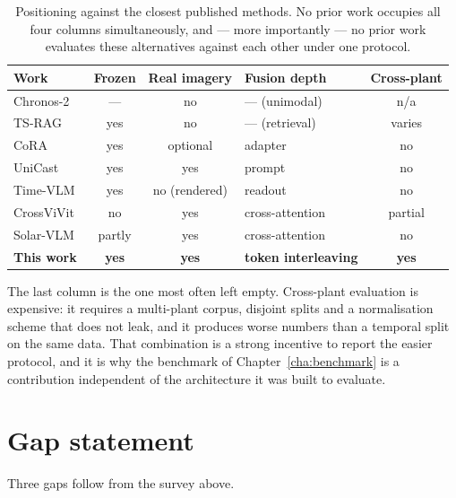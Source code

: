 \begin{table}[h!]
\centering
\small
\begin{tabular}{l c c l c}
\hline
\textbf{Work} & \textbf{Frozen} & \textbf{Real imagery} & \textbf{Fusion depth} &
\textbf{Cross-plant} \\
\hline
Chronos-2~\cite{chronos2} & --- & no & --- (unimodal) & n/a \\
TS-RAG~\cite{tsrag} & yes & no & --- (retrieval) & varies \\
CoRA~\cite{cora} & yes & optional & adapter & no \\
UniCast~\cite{unicast} & yes & yes & prompt & no \\
Time-VLM~\cite{timevlm} & yes & no (rendered) & readout & no \\
CrossViVit~\cite{crossvivit} & no & yes & cross-attention & partial \\
Solar-VLM~\cite{solarvlm} & partly & yes & cross-attention & no \\
\textbf{This work} & \textbf{yes} & \textbf{yes} & \textbf{token interleaving} &
\textbf{yes} \\
\hline
\end{tabular}
\caption{Positioning against the closest published methods. No prior work occupies all four
columns simultaneously, and --- more importantly --- no prior work evaluates these
alternatives against each other under one protocol.}
\label{tab:positioning}
\end{table}

The last column is the one most often left empty. Cross-plant evaluation is expensive: it
requires a multi-plant corpus, disjoint splits and a normalisation scheme that does not leak,
and it produces worse numbers than a temporal split on the same data. That combination is a
strong incentive to report the easier protocol, and it is why the benchmark of
Chapter~\ref{cha:benchmark} is a contribution independent of the architecture it was built to
evaluate.

\section{Gap statement}
\label{sec:gap}

Three gaps follow from the survey above.

